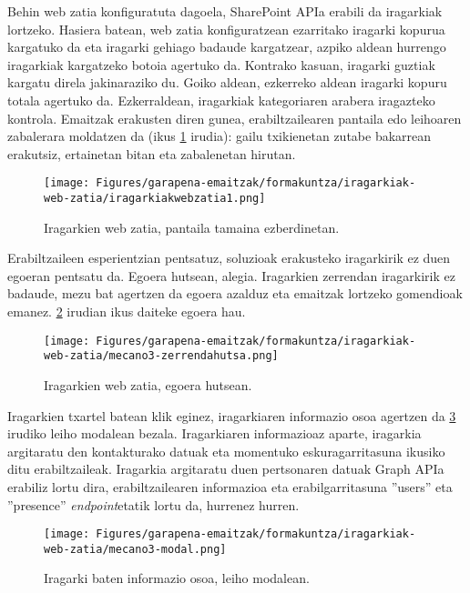Behin web zatia konfiguratuta dagoela, SharePoint APIa erabili da iragarkiak lortzeko. Hasiera batean, web zatia konfiguratzean
ezarritako iragarki kopurua kargatuko da eta iragarki gehiago badaude kargatzear, azpiko aldean hurrengo iragarkiak kargatzeko
botoia agertuko da. Kontrako kasuan, iragarki guztiak kargatu direla jakinaraziko du. Goiko aldean, ezkerreko aldean iragarki kopuru
totala agertuko da. Ezkerraldean, iragarkiak kategoriaren arabera iragazteko kontrola. Emaitzak erakusten diren gunea, erabiltzailearen
pantaila edo leihoaren zabalerara moldatzen da (ikus \ref{ads-responsive} irudia): gailu txikienetan zutabe bakarrean erakutsiz, ertainetan bitan eta zabalenetan hirutan. 

\begin{figure}[H]
\centering
\texttt{[image: Figures/garapena-emaitzak/formakuntza/iragarkiak-web-zatia/iragarkiakwebzatia1.png]}
\caption{Iragarkien web zatia, pantaila tamaina ezberdinetan.}
\label{ads-responsive}
\end{figure}

Erabiltzaileen esperientzian pentsatuz, soluzioak erakusteko iragarkirik ez duen egoeran pentsatu da. Egoera hutsean, alegia. Iragarkien
zerrendan iragarkirik ez badaude, mezu bat agertzen da egoera azalduz eta emaitzak lortzeko gomendioak emanez. \ref{ads-empty} irudian ikus daiteke egoera hau.

\begin{figure}[H]
\centering
\texttt{[image: Figures/garapena-emaitzak/formakuntza/iragarkiak-web-zatia/mecano3-zerrendahutsa.png]}
\caption{Iragarkien web zatia, egoera hutsean.}
\label{ads-empty}
\end{figure}

Iragarkien txartel batean klik eginez, iragarkiaren informazio osoa agertzen da \ref{ads-modal} irudiko leiho modalean bezala. Iragarkiaren informazioaz aparte,
iragarkia argitaratu den kontakturako datuak eta momentuko eskuragarritasuna ikusiko ditu erabiltzaileak. Iragarkia argitaratu duen
pertsonaren datuak Graph APIa erabiliz lortu dira, erabiltzailearen informazioa  eta erabilgarritasuna ''users'' eta 
''presence'' \textit{endpoint}etatik lortu da, hurrenez hurren.

\begin{figure}[H]
\centering
\texttt{[image: Figures/garapena-emaitzak/formakuntza/iragarkiak-web-zatia/mecano3-modal.png]}
\caption{Iragarki baten informazio osoa, leiho modalean.}
\label{ads-modal}
\end{figure}

